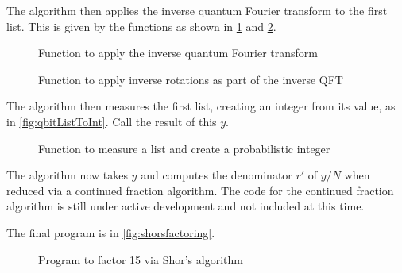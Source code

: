 The algorithm  then applies
the inverse quantum Fourier transform to the first 
\qbit{} list. This is given by the functions as shown in \ref{fig:inverseqft}
and \ref{fig:inverserotate}.

\begin{figure}[htbp]

\caption{Function to apply the inverse quantum Fourier transform}
\label{fig:inverseqft}
\end{figure}


\begin{figure}[htbp]

\caption{Function to apply inverse rotations as part of the inverse QFT}
\label{fig:inverserotate}
\end{figure}

The algorithm  then measures
 the first list,  creating an integer from its value, as in
\vref{fig:qbitListToInt}. Call  the result of this $y$. 


\begin{figure}[htbp]

\caption{Function to measure a list and create a probabilistic integer}
\label{fig:qbitListToInt}
\end{figure}

The algorithm now takes $y$ and computes the 
denominator $r'$ of $y/N$ when reduced 
via a continued fraction algorithm. The code for the 
continued fraction algorithm is still under active development and 
not included at this time.

The final program is in \vref{fig:shorsfactoring}.


\begin{figure}[htbp]

\caption{Program to factor 15 via Shor's algorithm}
\label{fig:shorsfactoring}
\end{figure}
